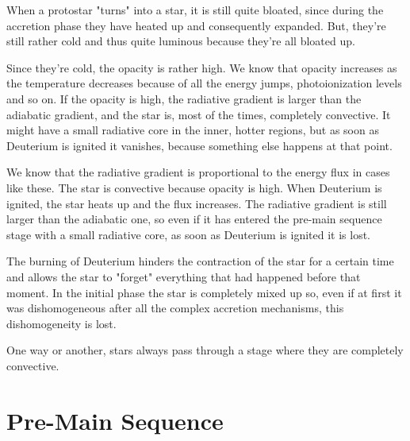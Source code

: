 \par When a protostar "turns" into a star, it is still quite bloated, since during the accretion phase they have heated up and consequently expanded. But, they're still rather cold and thus quite luminous because they're all bloated up.
\par Since they're cold, the opacity is rather high. We know that opacity increases as the temperature decreases because of all the energy jumps, photoionization levels and so on. If the opacity is high, the radiative gradient is larger than the adiabatic gradient, and the star is, most of the times, completely convective. It might have a small radiative core in the inner, hotter regions, but as soon as Deuterium is ignited it vanishes, because something else happens at that point.
\par We know that the radiative gradient is proportional to the energy flux in cases like these. The star is convective because opacity is high. When Deuterium is ignited, the star heats up and the flux increases. The radiative gradient is still larger than the adiabatic one, so even if it has entered the pre-main sequence stage with a small radiative core, as soon as Deuterium is ignited it is lost.
\par The burning of Deuterium hinders the contraction of the star for a certain time and allows the star to "forget" everything that had happened before that moment. In the initial phase the star is completely mixed up so, even if at first it was dishomogeneous after all the complex accretion mechanisms, this dishomogeneity is lost.
\par One way or another, stars always pass through a stage where they are completely convective.

\section{Pre-Main Sequence}

